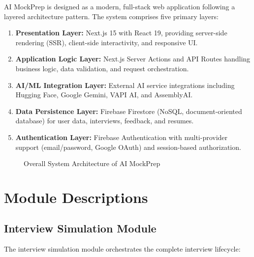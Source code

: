 \documentclass[12pt,a4paper,oneside]{report}
\begin{document}
AI MockPrep is designed as a modern, full-stack web application following a layered architecture pattern. The system comprises five primary layers:

\begin{enumerate}
  \item \textbf{Presentation Layer:} Next.js 15 with React 19, providing server-side rendering (SSR), client-side interactivity, and responsive UI.
  \item \textbf{Application Logic Layer:} Next.js Server Actions and API Routes handling business logic, data validation, and request orchestration.
  \item \textbf{AI/ML Integration Layer:} External AI service integrations including Hugging Face, Google Gemini, VAPI AI, and AssemblyAI.
  \item \textbf{Data Persistence Layer:} Firebase Firestore (NoSQL, document-oriented database) for user data, interviews, feedback, and resumes.
  \item \textbf{Authentication Layer:} Firebase Authentication with multi-provider support (email/password, Google OAuth) and session-based authorization.
\end{enumerate}

\begin{figure}[H]
\centering
{}
\caption{Overall System Architecture of AI MockPrep}
\label{fig:system_architecture}
\end{figure}


\section{Module Descriptions}

\subsection{Interview Simulation Module}
The interview simulation module orchestrates the complete interview lifecycle:
\end{document}
